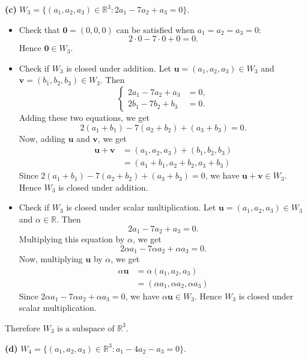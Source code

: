 \documentclass{article}
\begin{document}
\noindent
\textbf{(c)} $W_3 = \{(a_1,a_2,a_3) \in \mathbb{R}^3 : 2a_1 - 7a_2 + a_3 = 0\}$.

\begin{itemize}
\item Check that $\mathbf{0} = (0,0,0)$ can be satisfied when $a_1 = a_2 = a_3 = 0$:
\[
2\cdot 0 - 7\cdot 0 + 0 = 0.
\]
Hence $\mathbf{0} \in W_3$.

\item Check if $W_3$ is closed under addition. Let $\mathbf{u} = (a_1,a_2,a_3) \in W_3$ and $\mathbf{v} = (b_1,b_2,b_3) \in W_3$. Then
\[
\left\{\begin{aligned}
2a_1 - 7a_2 + a_3 &= 0, \\
2b_1 - 7b_2 + b_3 &= 0.
\end{aligned}\right.
\]
Adding these two equations, we get
\[
2(a_1 + b_1) - 7(a_2 + b_2) + (a_3 + b_3) = 0.
\]
Now, adding $\mathbf{u}$ and $\mathbf{v}$, we get
\begin{align*}
\mathbf{u} + \mathbf{v} &= (a_1, a_2, a_3) + (b_1, b_2, b_3) \\
&= (a_1 + b_1, a_2 + b_2, a_3 + b_3)
\end{align*}
Since $2(a_1 + b_1) - 7(a_2 + b_2) + (a_3 + b_3) = 0$, we have $\mathbf{u} + \mathbf{v} \in W_3$. Hence $W_3$ is closed under addition.

\item Check if $W_3$ is closed under scalar multiplication. Let $\mathbf{u} = (a_1,a_2,a_3) \in W_3$ and $\alpha \in \mathbb{R}$. Then
\[
2a_1 - 7a_2 + a_3 = 0.
\]
Multiplying this equation by $\alpha$, we get
\[
2\alpha a_1 - 7\alpha a_2 + \alpha a_3 = 0.
\]
Now, multiplying $\mathbf{u}$ by $\alpha$, we get
\begin{align*}
\alpha \mathbf{u} &= \alpha (a_1, a_2, a_3) \\
&= (\alpha a_1, \alpha a_2, \alpha a_3)
\end{align*}
Since $2\alpha a_1 - 7\alpha a_2 + \alpha a_3 = 0$, we have $\alpha \mathbf{u} \in W_3$. Hence $W_3$ is closed under scalar multiplication.
\end{itemize}

Therefore $W_3 \text{ is a subspace of } \mathbb{R}^3$.

\bigskip

\noindent
\textbf{(d)} $W_4 = \{(a_1,a_2,a_3) \in \mathbb{R}^3 : a_1 - 4a_2 - a_3 = 0\}$.
\end{document}
